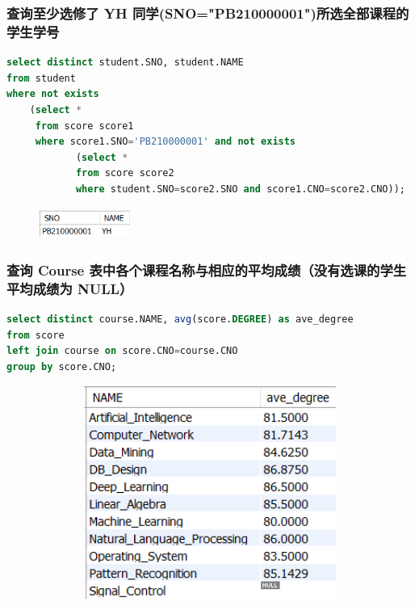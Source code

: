 \documentclass{ctexart}
\begin{document}
\subsubsection{查询至少选修了 YH 同学(SNO="PB210000001")所选全部课程的学生学号}
\begin{lstlisting}[language=sql]
select distinct student.SNO, student.NAME
from student
where not exists
	(select *
	 from score score1
     where score1.SNO='PB210000001' and not exists
			(select *
            from score score2
            where student.SNO=score2.SNO and score1.CNO=score2.CNO));
\end{lstlisting}
\begin{figure}[H]
	\centering 
	\includegraphics[height=1cm,width=3cm]{16.png}
	\end{figure}
\subsubsection{查询 Course 表中各个课程名称与相应的平均成绩（没有选课的学生平均成绩为 NULL） }
\begin{lstlisting}[language=sql]
select distinct course.NAME, avg(score.DEGREE) as ave_degree
from score
left join course on score.CNO=course.CNO
group by score.CNO;

\end{lstlisting}
\begin{figure}[H]
	\centering 
	\includegraphics[height=7cm,width=14cm]{39.png}
	\end{figure}
\end{document}
